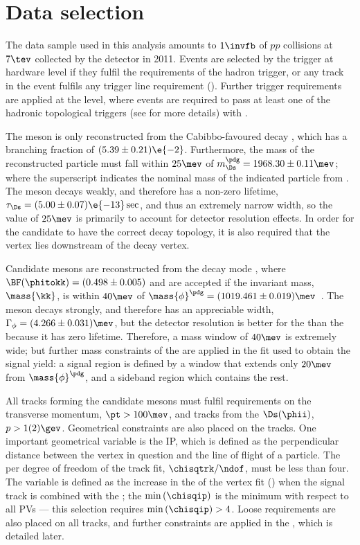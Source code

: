 \section{Data selection}
\label{sec:dsphi:sel}

The data sample used in this analysis amounts to
$1\invfb$ of $pp$ collisions at $7\tev$ collected by the \lhcb detector in 2011.
Events are selected by the trigger at hardware level if they fulfil the requirements of the \lone
hadron trigger, or any track in the event fulfils any \lone trigger line requirement (\tis).
Further trigger requirements are applied at the \hlttwo level, where events are required to pass at
least one of the hadronic topological triggers (see  for more details) with
\tos.

The \Ds meson is only reconstructed from the Cabibbo-favoured decay \dstokkpi,
which has a branching fraction of $(5.39\pm0.21)\e{-2}$.
Furthermore, the mass of the reconstructed particle must fall within $25\mev$ of
$m_{\Ds}^\pdg=1968.30\pm0.11\mev$; where the superscript \pdg indicates the nominal mass of the
indicated particle from .
The \Ds meson decays weakly, and therefore has a non-zero lifetime,
$\tau_{\Ds}=(5.00\pm0.07)\e{-13}\sec$, and thus an extremely narrow width, so the value of $25\mev$
is primarily to account for detector resolution effects.
In order for the candidate to have the correct decay topology, it is also required that the \Ds
vertex lies downstream of the \Bp decay vertex.

Candidate \phii mesons are reconstructed from the decay mode \phitokk, where
$\BF(\phitokk)=(0.498\pm0.005)$ and are accepted if the
invariant \kk mass, $\mass{\kk}$, is within $40\mev$ of
$\mass{\phi}^\pdg=(1019.461\pm0.019)\mev$~\cite{PDG2012}.
The \phii meson decays strongly, and therefore has an appreciable width,
$\Gamma_\phi=(4.266\pm0.031)\mev$, but the detector resolution is better for the \phii than the \Ds
because it has zero lifetime.
Therefore, a mass window of $40\mev$ is extremely wide; but further mass constraints of the \phii
are applied in the fit used to obtain the signal yield: a signal region is defined by a window that
extends only $20\mev$ from $\mass{\phi}^\pdg$, and a sideband region which contains the rest.

All tracks forming the candidate mesons must fulfil requirements on the transverse momentum,
$\pt>100\mev$, and tracks from the $\Ds(\phii)$, $p>1(2)\gev$.
Geometrical constraints are also placed on the tracks.
One important geometrical variable is the \gls{IP}, which is defined as the perpendicular distance
between the vertex in question and the line of flight of a particle.
The \chisq per degree of freedom of the track fit, $\chisqtrk/\ndof$, must be less than four.
The variable \chisqip is defined as the increase in the \chisq of the vertex fit (\chisqvtx) when
the signal track is combined with the \pv; the $\min\left(\chisqip\right)$ is the minimum \chisqip
with respect to all \glspl{PV} --- this selection requires $\min\left(\chisqip\right)>4$.
Loose \pid requirements are also placed on all tracks, and further \pid constraints are applied in
the \bdt, which is detailed later.


